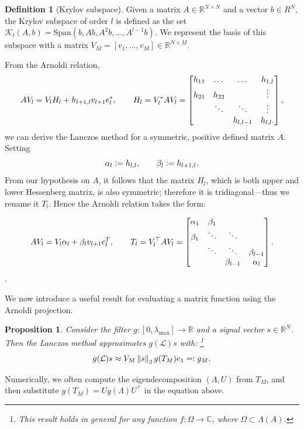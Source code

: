 \documentclass[11pt]{article}
\renewcommand{\mathbb}[1]{\mathds{#1}}
\newcommand{\R}{\mathbb{R}}
\newcommand{\C}{\mathbb{C}}
\renewcommand{\L}{\mathcal{L}}
\newcommand{\defeq}{\vcentcolon=}
\newcommand{\eqdef}{=\vcentcolon}
\newcommand{\norm}[1]{\left\lVert#1\right\rVert}
\newtheorem{proposition}[theorem]{Proposition}
\theoremstyle{definition}
\newtheorem{definition}[theorem]{Definition}
\theoremstyle{remark}
\theoremstyle{experimental}
\begin{document}
\begin{definition}[Krylov subspace]
 Given a matrix $ A \in \R^{N \times N} $ and a vector $ b \in R^N $, the Krylov subspace of order
 $l$ is defined as the set $ \mathcal{K}_l (A,b) = \text{Span} \left(b, Ab, A^2b, \dots,
A^{l-1}b\right)  $. We represent the basis of this subspace with a matrix $ V_M = \left[ v_1,\dots,v_M
\right] \in \R^{N \times M}$.
\end{definition}
From the Arnoldi relation,
\begin{equation*}
  AV_l = V_lH_l + h_{l+1,l}v_{l+1}e_l^{*}, \\ \hspace{20pt}
  H_l = V_l^{*}AV_l =
  \begin{bmatrix}
    h_{11} & \dots & \dots & h_{1,l} \\
    h_{21} & h_{22} & & \vdots \\
           & \ddots & \ddots & \vdots \\
           & & h_{l,l-1} & h_{l,l}.
  \end{bmatrix},
\end{equation*}
we can derive the Lanczos method for a symmetric, positive defined matrix $ A $. Setting
\begin{equation*}
\alpha_l \defeq h_{l,l},\hspace{20pt}\beta_l \defeq h_{l+1,l}.
\end{equation*}
From our hypothesis on $ A $, it follows that the matrix $ H_l $, which is both upper and lower Hessenberg 
matrix, is also symmetric; therefore it is tridiagonal---thus we rename it $ T_l $. Hence
the Arnoldi relation takes the form:

\begin{equation*}
  AV_l = V_l \alpha_l  + \beta_l v_{l+1}e_l^{T}, \\ \hspace{20pt}
  T_l = V_l^{\top} A V_l = \begin{bmatrix}
    \alpha_1 & \beta_1 \\
    \beta_1 & \ddots & \ddots \\
      & \ddots & \ddots & \beta_{l-1} \\
      & & \beta_{l-1} & \alpha_l
  \end{bmatrix}.
\end{equation*}.

We now introduce a useful result for evaluating a matrix function using the Arnoldi projection.
\begin{proposition}
 Consider the filter $ g : [0, \lambda_{\text{max}}] \to \R$ and a signal vector $ s \in \R^N $.
 Then the Lanczos method approximates $ g(\L)s $ with: \footnote{This result holds in general for any function $f :\Omega \to \C$, where $ \Omega \subset \Lambda(A) $.}
\begin{equation}
 g(\L)s \approx  V_M \norm{s}_2 g(T_M) e_1 \eqdef g_M. \label{eq:projection}
\end{equation}
\end{proposition}
Numerically, we often compute the eigendecomposition $ (\Lambda,U) $ from $ T_M $, and then
substitute $ g(T_M) = Ug(\Lambda)U^{\top} $ in the equation above.
\end{document}
